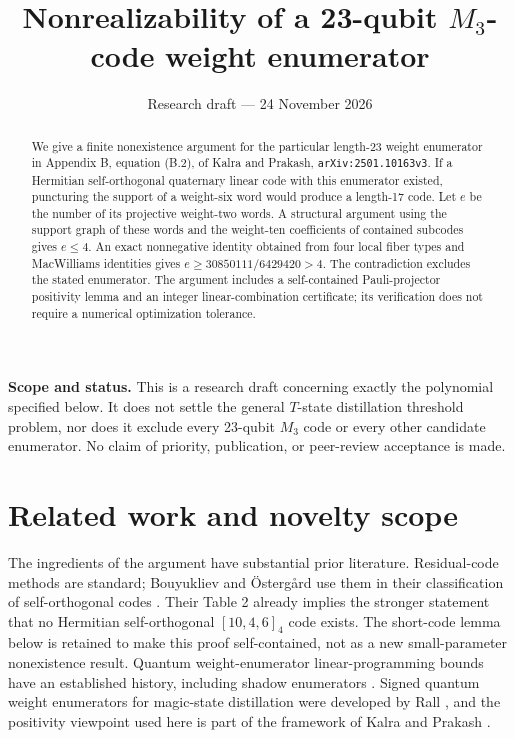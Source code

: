 \documentclass[11pt]{article}
\title{Nonrealizability of a 23-qubit $M_3$-code weight enumerator}
\author{}
\date{Research draft --- 24 November 2026}
\theoremstyle{remark}
\begin{document}
\maketitle

\begin{abstract}
We give a finite nonexistence argument for the particular length-23 weight
enumerator in Appendix B, equation (B.2), of Kalra and Prakash,
\texttt{arXiv:2501.10163v3}.  If a Hermitian self-orthogonal quaternary linear
code with this enumerator existed, puncturing the support of a weight-six
word would produce a length-17 code.  Let $e$ be the number of its projective
weight-two words.  A structural argument using the support graph of these
words and the weight-ten coefficients of contained subcodes gives $e\leq4$.
An exact nonnegative identity obtained from four local fiber types and
MacWilliams identities gives
$e\geq30850111/6429420>4$.  The contradiction excludes the stated enumerator.
The argument includes a self-contained Pauli-projector positivity lemma and
an integer linear-combination certificate; its verification does not require
a numerical optimization tolerance.
\end{abstract}

\noindent\textbf{Scope and status.}
This is a research draft concerning exactly the polynomial specified below.
It does not settle the general $T$-state distillation threshold problem, nor
does it exclude every 23-qubit $M_3$ code or every other candidate enumerator.
No claim of priority, publication, or peer-review acceptance is made.

\section*{Related work and novelty scope}

The ingredients of the argument have substantial prior literature.
Residual-code methods are standard; Bouyukliev and {\"O}sterg{\aa}rd
use them in their classification of self-orthogonal codes
\cite[Section 3]{BO}.  Their Table 2 already implies the stronger
statement that no Hermitian self-orthogonal $[10,4,6]_4$ code exists.
The short-code lemma below is retained to make this proof self-contained,
not as a new small-parameter nonexistence result.
Quantum weight-enumerator linear-programming bounds have an established
history, including shadow enumerators \cite{Rains}.  Signed quantum
weight enumerators for magic-state distillation were developed by
Rall \cite{Rall}, and the positivity viewpoint used here is part of the
framework of Kalra and Prakash \cite{KP}.
\end{document}
